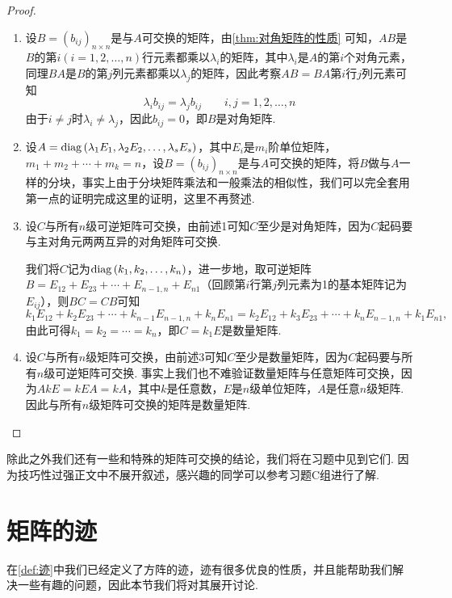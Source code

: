 \begin{proof}
    \begin{enumerate}
        \item 设$B=(b_{ij})_{n\times n}$是与$A$可交换的矩阵，由\autoref{thm:对角矩阵的性质} 可知，$AB$是$B$的第$i(i=1,2,\ldots,n)$行元素都乘以$\lambda_i$的矩阵，其中$\lambda_i$是$A$的第$i$个对角元素，同理$BA$是$B$的第$j$列元素都乘以$\lambda_j$的矩阵，因此考察$AB=BA$第$i$行$j$列元素可知
              \[\lambda_ib_{ij}=\lambda_jb_{ij}\qquad i,j=1,2,\ldots,n\]
              由于$i\neq j$时$\lambda_i\neq\lambda_j$，因此$b_{ij}=0$，即$B$是对角矩阵.

        \item 设$A=\operatorname{diag}{(\lambda_1E_1,\lambda_2E_2,\ldots,\lambda_sE_s)}$，其中$E_i$是$m_i$阶单位矩阵，$m_1+m_2+\cdots+m_k=n$，设$B=(b_{ij})_{n\times n}$是与$A$可交换的矩阵，将$B$做与$A$一样的分块，事实上由于分块矩阵乘法和一般乘法的相似性，我们可以完全套用第一点的证明完成这里的证明，这里不再赘述.

        \item 设$C$与所有$n$级可逆矩阵可交换，由前述1可知$C$至少是对角矩阵，因为$C$起码要与主对角元两两互异的对角矩阵可交换.

              我们将$C$记为$\operatorname{diag}{(k_1,k_2,\ldots,k_n)}$，进一步地，取可逆矩阵$B=E_{12}+E_{23}+\cdots+E_{n-1,n}+E_{n1}$（回顾第$i$行第$j$列元素为1的基本矩阵记为$E_{ij}$），则$BC=CB$可知
              \[k_1E_{12}+k_2E_{23}+\cdots+k_{n-1}E_{n-1,n}+k_nE_{n1}=k_2E_{12}+k_3E_{23}+\cdots+k_nE_{n-1,n}+k_1E_{n1},\]
              由此可得$k_1=k_2=\cdots=k_n$，即$C=k_1E$是数量矩阵.

        \item 设$C$与所有$n$级矩阵可交换，由前述3可知$C$至少是数量矩阵，因为$C$起码要与所有$n$级可逆矩阵可交换. 事实上我们也不难验证数量矩阵与任意矩阵可交换，因为$AkE=kEA=kA$，其中$k$是任意数，$E$是$n$级单位矩阵，$A$是任意$n$级矩阵. 因此与所有$n$级矩阵可交换的矩阵是数量矩阵.
    \end{enumerate}
\end{proof}

除此之外我们还有一些和特殊的矩阵可交换的结论，我们将在习题中见到它们. 因为技巧性过强正文中不展开叙述，感兴趣的同学可以参考习题C组进行了解.

\section{矩阵的迹}

在\autoref{def:迹}中我们已经定义了方阵的迹，迹有很多优良的性质，并且能帮助我们解决一些有趣的问题，因此本节我们将对其展开讨论.


